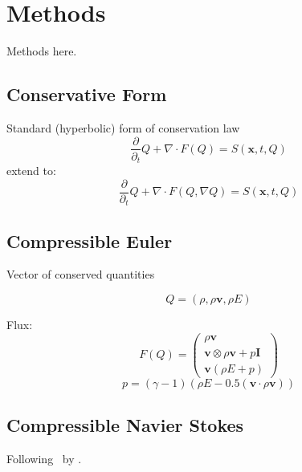 \chapter{Methods}
Methods here.

\newcommand{\Qrho}{\ensuremath{\rho}}
\newcommand{\Qj}{\ensuremath{\rho \bm{v}}}
\newcommand{\Qv}{\ensuremath{\bm{v}}}
\newcommand{\QE}{\ensuremath{\rho E}}
\newcommand{\stressT}{\ensuremath{\bm{\sigma}}}
\newcommand{\pressure}{\ensuremath{p}}



\section{Conservative Form}
Standard (hyperbolic) form of conservation law
\begin{equation}
  \label{eq:conservation-law}
 \frac{\partial}{\partial_t}  Q + \nabla \cdot F(Q) = S(\bm{x}, t, Q)
\end{equation}
extend to:
\begin{equation}
  \label{eq:conservation-law}
 \frac{\partial}{\partial_t}  Q + \nabla \cdot F(Q, \nabla Q) = S(\bm{x}, t, Q)
\end{equation}

\section{Compressible Euler}
Vector of conserved quantities


\begin{equation}
  \label{eq:conserved-variables}
 Q = \left( \Qrho, \Qj, \QE \right) 
\end{equation}

\newcommand{\eulerFlux}{%
  \begin{pmatrix}
    \Qj \\
    \Qv  \otimes \Qj + \pressure \bm{I}  \\
    \Qv (\QE + \pressure)
  }
Flux:
\begin{equation}
  F(Q) = \eulerFlux
  \end{pmatrix}
\end{equation}
\begin{equation}
  \pressure = (\gamma - 1) \left(\QE - 0.5 \left(\Qv \cdot \Qj \right) \right)
\end{equation}

\section{Compressible Navier Stokes}
Following~\cite{dumbser2010arbitrary} by \citeauthor{dumbser2010arbitrary}.

